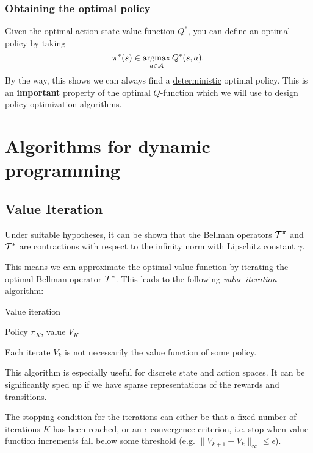 \documentclass[../course-notes.tex]{subfiles}
\begin{document}
\subsubsection{Obtaining the optimal policy}

Given the optimal action-state value function $Q^*$, you can define an optimal policy by taking
\[
	\pi^*(s) \in \operatorname*{\mathrm{argmax}}_{a\in\mathcal{A}} Q^*(s,a).
\]
By the way, this shows we can always find a \underline{deterministic} optimal policy. This is an \textbf{important} property of the optimal $Q$-function which we will use to design policy optimization algorithms.


\section{Algorithms for dynamic programming}



\subsection{Value Iteration}

Under suitable hypotheses, it can be shown that the Bellman operators $\mathcal{T}^\pi$ and $\mathcal{T}^*$ are contractions with respect to the infinity norm with Lipschitz constant $\gamma$.

This means we can approximate the optimal value function by iterating the optimal Bellman operator $\mathcal{T}^*$. This leads to the following \textit{value iteration} algorithm:

\begin{algorithm}
	\caption{Value iteration}
	\Return Policy $\pi_K$, value $V_K$\;
\end{algorithm}

\begin{remark}
Each iterate $V_k$ is not necessarily the value function of some policy.
\end{remark}

This algorithm is especially useful for discrete state and action spaces. It can be significantly sped up if we have sparse representations of the rewards and transitions.

The stopping condition for the iterations can either be that a fixed number of iterations $K$ has been reached, or an $\epsilon$-convergence criterion, i.e. stop when value function increments fall below some threshold (e.g. $\|V_{k+1} - V_k\|_{\infty} \leq \epsilon$).
\end{document}

